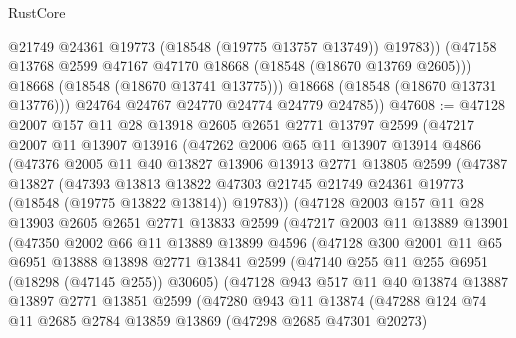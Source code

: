 \begin{lexlean}{RustCore}
\begin{coremodule}
                @21749
                @24361
                @19773
                (@18548 (@19775 @13757 @13749))
                @19783))
            (@47158 @13768 @2599 @47167 @47170 @18668 (@18548 (@18670 @13769 @2605)))
            @18668
            (@18548 (@18670 @13741 @13775)))
          @18668
          (@18548 (@18670 @13731 @13776)))
        @24764
        @24767
        @24770
        @24774
        @24779
        @24785))
@47608 := @47128
    @2007
    @157
    @11
    @28
    @13918
    @2605
    @2651
    @2771
    @13797
    @2599
    (@47217
      @2007
      @11
      @13907
      @13916
      (@47262
        @2006
        @65
        @11
        @13907
        @13914
        @4866
        (@47376
          @2005
          @11
          @40
          @13827
          @13906
          @13913
          @2771
          @13805
          @2599
          (@47387
            @13827
            (@47393
              @13813
              @13822
              @47303
              @21745
              @21749
              @24361
              @19773
              (@18548 (@19775 @13822 @13814))
              @19783))
          (@47128
            @2003
            @157
            @11
            @28
            @13903
            @2605
            @2651
            @2771
            @13833
            @2599
            (@47217
              @2003
              @11
              @13889
              @13901
              (@47350
                @2002
                @66
                @11
                @13889
                @13899
                @4596
                (@47128
                  @300
                  @2001
                  @11
                  @65
                  @6951
                  @13888
                  @13898
                  @2771
                  @13841
                  @2599
                  (@47140 @255 @11 @255 @6951 (@18298 (@47145 @255)) @30605)
                  (@47128
                    @943
                    @517
                    @11
                    @40
                    @13874
                    @13887
                    @13897
                    @2771
                    @13851
                    @2599
                    (@47280
                      @943
                      @11
                      @13874
                      (@47288
                        @124
                        @74
                        @11
                        @2685
                        @2784
                        @13859
                        @13869
                        (@47298 @2685 @47301 @20273)

\end{coremodule}
\end{lexlean}

